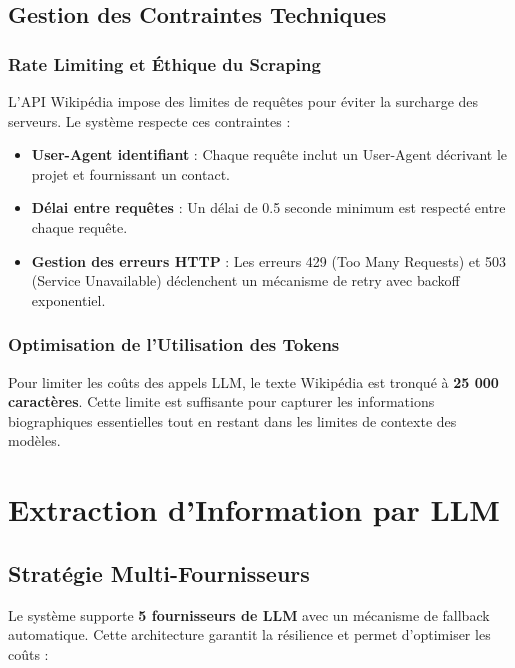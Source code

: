\documentclass[12pt,a4paper]{report}
\begin{document}
\section{Gestion des Contraintes Techniques}

\subsection{Rate Limiting et Éthique du Scraping}

L'API Wikipédia impose des limites de requêtes pour éviter la surcharge des serveurs. Le système respecte ces contraintes :

\begin{itemize}
    \item \textbf{User-Agent identifiant} : Chaque requête inclut un User-Agent décrivant le projet et fournissant un contact.
    \item \textbf{Délai entre requêtes} : Un délai de 0.5 seconde minimum est respecté entre chaque requête.
    \item \textbf{Gestion des erreurs HTTP} : Les erreurs 429 (Too Many Requests) et 503 (Service Unavailable) déclenchent un mécanisme de retry avec backoff exponentiel.
\end{itemize}

\subsection{Optimisation de l'Utilisation des Tokens}

Pour limiter les coûts des appels LLM, le texte Wikipédia est tronqué à \textbf{25 000 caractères}. Cette limite est suffisante pour capturer les informations biographiques essentielles tout en restant dans les limites de contexte des modèles.

\chapter{Extraction d'Information par LLM}

\section{Stratégie Multi-Fournisseurs}

Le système supporte \textbf{5 fournisseurs de LLM} avec un mécanisme de fallback automatique. Cette architecture garantit la résilience et permet d'optimiser les coûts :
\end{document}
